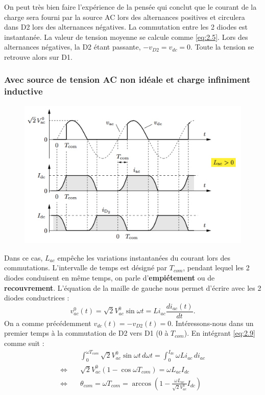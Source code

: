 			On peut très bien faire l'expérience de la pensée qui conclut que le courant de la charge sera fourni par la source AC lors des alternances positives et circulera dans D2 lors des alternances négatives. La commutation entre les 2 diodes est instantanée. La valeur de tension moyenne se calcule comme \eqref{eq:2.5}. Lors des alternances négatives, la D2 étant passante, $-v_{D2} = v_{dc} = 0$. Toute la tension se retrouve alors sur D1.  
			
		\subsubsection{Avec source de tension AC non idéale et charge infiniment inductive}
			\begin{figure}
			\vspace{-5mm}
			\includegraphics[scale=0.3]{ch2/6}
			\end{figure}
			Dans ce cas, $L_{ac}$ empêche les variations instantanées du courant lors des commutations. L'intervalle de temps est désigné par $T_{com}$, pendant lequel les 2 diodes conduisent en même temps, on parle d'\textbf{empiétement} ou de \textbf{recouvrement}. L'équation de la maille de gauche nous permet d'écrire avec les 2 diodes conductrices : 
			\begin{equation}
				v_{ac}^0 (t) = \sqrt{2} V_{ac}^0 \sin \omega t = Li_{ac}\frac{di_{ac}(t)}{dt}.
				\label{eq:2.9}
			\end{equation}
			On a comme précédemment $v_{dc}(t) = - v_{D2}(t) = 0$. Intéressons-nous dans un premier temps à la commutation de D2 vers D1 (0 à $T_{com}$). En intégrant \eqref{eq:2.9} comme suit : 
			\begin{equation}
			\begin{aligned}
				&\int _0 ^{\omega T_{com}} \sqrt{2} V_{ac}^0 \sin \omega t \, d\omega t = \int _0 ^{I_{dc}} \omega Li_{ac}\, di_{ac} \\
				\Leftrightarrow \quad &\sqrt{2} V_{ac}^0 (1- \cos \omega T_{com}) = \omega L_{ac} I_{dc}\\
				\Leftrightarrow \quad &\theta _{com} = \omega T_{com} = \arccos \left( 1 - \frac{\omega L_{ac}}{\sqrt{2} V_{ac}^0}I_{dc} \right)
				\end{aligned}
			\end{equation}			 
